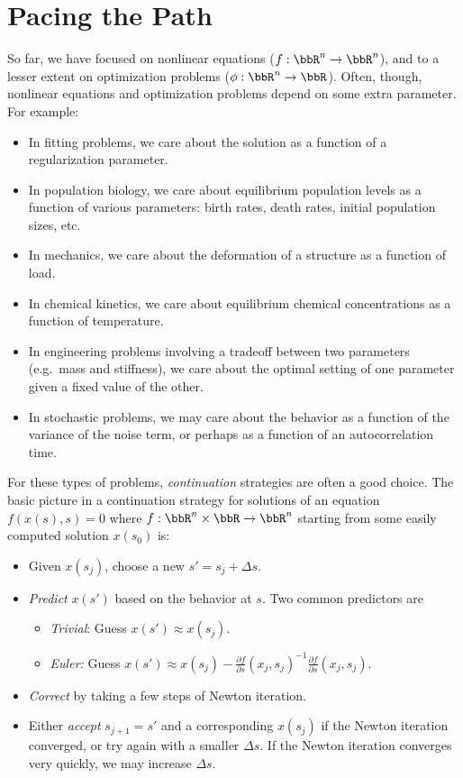 \documentclass[12pt, leqno]{article} %
\begin{document}

\section*{Pacing the Path}

So far, we have focused on
nonlinear equations ($f : \bbR^n \rightarrow \bbR^n$),
and to a lesser extent on
optimization problems ($\phi : \bbR^n \rightarrow \bbR$).
Often, though, nonlinear equations and optimization problems
depend on some extra parameter.  For example:
\begin{itemize}
\item
  In fitting problems, we care about the solution as a function
  of a regularization parameter.
\item
  In population biology, we care about equilibrium population levels
  as a function of various parameters: birth rates, death rates,
  initial population sizes, etc.
\item
  In mechanics, we care about the deformation of a structure
  as a function of load.
\item
  In chemical kinetics, we care about equilibrium chemical
  concentrations as a function of temperature.
\item
  In engineering problems involving a tradeoff between two parameters
  (e.g.~mass and stiffness), we care about the optimal setting of one
  parameter given a fixed value of the other.
\item
  In stochastic problems, we may care about the behavior as a function of
  the variance of the noise term, or perhaps as a function of an
  autocorrelation time.
\end{itemize}
For these types of problems, {\em continuation} strategies are often
a good choice.  The basic picture in a continuation strategy for
solutions of an equation $f(x(s),s) = 0$ where
$f : \bbR^n \times \bbR \rightarrow \bbR^n$
starting from some easily computed solution $x(s_0)$ is:
\begin{itemize}
\item
  Given $x(s_j)$, choose a new $s' = s_j + \Delta s$.
\item
  {\em Predict} $x(s')$ based on the behavior at $s$.  Two common
  predictors are
  \begin{itemize}
  \item {\em Trivial}: Guess $x(s') \approx x(s_j)$.
  \item {\em Euler:} Guess
    $x(s') \approx x(s_j) - \frac{\partial f}{\partial s}(x_j,s_j)^{-1} \frac{\partial f}{\partial s}(x_j,s_j)$.
  \end{itemize}
\item
  {\em Correct} by taking a few steps of Newton iteration.
\item
  Either {\em accept} $s_{j+1} = s'$ and a corresponding $x(s_j)$ if
  the Newton iteration converged, or try again with a smaller $\Delta
  s$.  If the Newton iteration converges very quickly, we may
  increase $\Delta s$.
\end{itemize}
\end{document}
